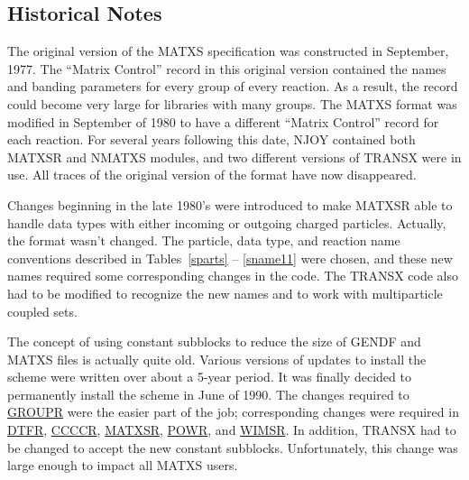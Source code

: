 \subsection{Historical Notes}
\label{ssMATXSR_history}

The original version of the MATXS specification was constructed in
September, 1977.  The ``Matrix Control'' record in this original
version contained the names and banding parameters for every group of
every reaction.  As a result, the record could become very large for
libraries with many groups.  The MATXS format was modified in September
of 1980 to have a different ``Matrix Control'' record for each reaction.
For several years following this date, NJOY contained both MATXSR and
NMATXS modules, and two different versions of TRANSX were in use.  All
traces of the original version of the format have now disappeared.

Changes beginning in the late 1980's were introduced to make MATXSR
able to handle data types with either incoming or outgoing charged
particles.  Actually, the format wasn't changed.  The particle,
data type, and reaction name conventions described in
Tables~\ref{sparts} -- \ref{sname11} were chosen, and these new names
required some corresponding changes in the code.  The TRANSX code
also had to be modified to recognize the new names and to work with
multiparticle coupled sets.

The concept of using constant subblocks to reduce the size of GENDF and
MATXS files is actually quite old.  Various versions of updates to
install the scheme were written over about a 5-year period.  It was
finally decided to permanently install the scheme in June of 1990.
The changes required to \hyperlink{sGROUPRhy}{GROUPR}
were the easier part of the job; corresponding changes were required
in \hyperlink{sDTFRhy}{DTFR}, \hyperlink{sCCCCRhy}{CCCCR},
\hyperlink{sMATXSRhy}{MATXSR}, \hyperlink{sPOWRhy}{POWR},
and \hyperlink{sWIMSRhy}{WIMSR}.  In addition, TRANSX had
to be changed to accept the new
constant subblocks.  Unfortunately, this change was large enough to
impact all MATXS users.

